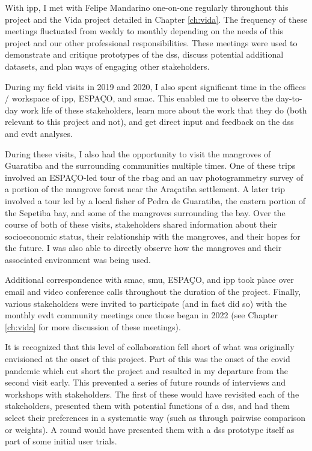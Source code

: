 With \ac{ipp}, I met with Felipe Mandarino one-on-one regularly throughout this project and the Vida project detailed in Chapter \ref{ch:vida}. The frequency of these meetings fluctuated from weekly to monthly depending on the needs of this project and our other professional responsibilities. These meetings were used to demonstrate and critique prototypes of the \ac{dss}, discuss potential additional datasets, and plan ways of engaging other stakeholders.

During my field visits in 2019 and 2020, I also spent significant time in the offices / workspace of \ac{ipp}, ESPAÇO, and \ac{smac}. This enabled me to observe the day-to-day work life of these stakeholders, learn more about the work that they do (both relevant to this project and not), and get direct input and feedback on the \ac{dss} and \ac{evdt} analyses. 

During these visits, I also had the opportunity to visit the mangroves of Guaratiba and the surrounding communities multiple times. One of these trips involved an ESPAÇO-led tour of the \ac{rbag} and an \ac{uav} photogrammetry survey of a portion of the mangrove forest near the Araçatiba settlement. A later trip involved a tour led by a local fisher of Pedra de Guaratiba, the eastern portion of the Sepetiba bay, and some of the mangroves surrounding the bay. Over the course of both of these visits, stakeholders shared information about their socioeconomic status, their relationship with the mangroves, and their hopes for the future. I was also able to directly observe how the mangroves and their associated environment was being used.

Additional correspondence with \ac{smac}, \ac{smu}, ESPAÇO, and \ac{ipp} took place over email and video conference calls throughout the duration of the project. Finally, various stakeholders were invited to participate (and in fact did so) with the monthly \ac{evdt} community meetings once those began in 2022 (see Chapter \ref{ch:vida} for more discussion of these meetings). 

It is recognized that this level of collaboration fell short of what was originally envisioned at the onset of this project. Part of this was the onset of the \ac{covid} pandemic which cut short the project and resulted in my departure from the second visit early. This prevented a series of future rounds of interviews and workshops with stakeholders. The first of these would have revisited each of the stakeholders, presented them with potential functions of a \ac{dss}, and had them select their preferences in a systematic way (such as through pairwise comparison or weights). A round would have presented them with a \ac{dss} prototype itself as part of some initial user trials.

